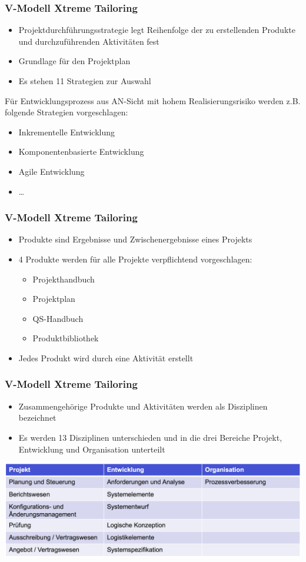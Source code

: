 \begin{frame}
\frametitle{V-Modell Xtreme Tailoring}
	\begin{itemize}
		\item Projektdurchführungsstrategie legt Reihenfolge der zu erstellenden
		Produkte und durchzuführenden Aktivitäten fest
		\item Grundlage für den Projektplan
		\item Es stehen 11 Strategien zur Auswahl
	\end{itemize}
	\bigskip
	Für Entwicklungsprozess aus AN-Sicht mit hohem Realisierungsrisiko werden
	z.B. folgende Strategien vorgeschlagen:
	\begin{itemize}
		\item Inkrementelle Entwicklung
		\item Komponentenbasierte Entwicklung
		\item Agile Entwicklung
		\item \ldots
	\end{itemize}
\end{frame}

\begin{frame}
\frametitle{V-Modell Xtreme Tailoring}
	\begin{itemize}
		\item Produkte sind Ergebnisse und Zwischenergebnisse eines Projekts
		\item 4 Produkte werden für alle Projekte verpflichtend vorgeschlagen:
		\begin{itemize}
			\item Projekthandbuch
			\item Projektplan
			\item QS-Handbuch
			\item Produktbibliothek
		\end{itemize}
		\item Jedes Produkt wird durch eine Aktivität erstellt
	\end{itemize}
\end{frame}

\begin{frame}
\frametitle{V-Modell Xtreme Tailoring}
	\begin{itemize}
		\item Zusammengehörige Produkte und Aktivitäten werden als Disziplinen
		bezeichnet
		\item Es werden 13 Disziplinen unterschieden und in die drei Bereiche
		Projekt, Entwicklung und Organisation unterteilt
	\end{itemize}
	\center\includegraphics[width=1\textwidth,
			keepaspectratio=true]{bilder/vmodell_disziplinen.png}
\end{frame}


